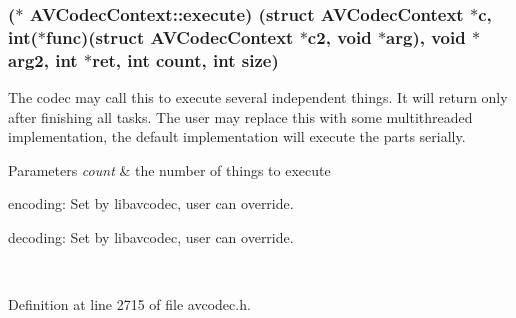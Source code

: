 \subsubsection[{\texorpdfstring{execute}{execute}}]{($\ast$ A\+V\+Codec\+Context\+::execute) (struct {\bf A\+V\+Codec\+Context} $\ast${\bf c}, {\bf int}($\ast$func)(struct {\bf A\+V\+Codec\+Context} $\ast${\bf c2}, {\bf void} $\ast$arg), {\bf void} $\ast$arg2, {\bf int} $\ast$ret, {\bf int} {\bf count}, {\bf int} {\bf size})}\hypertarget{struct_a_v_codec_context_a83b625bf9454b63ee8c04ac4f8ef648c}{}\label{struct_a_v_codec_context_a83b625bf9454b63ee8c04ac4f8ef648c}
The codec may call this to execute several independent things. It will return only after finishing all tasks. The user may replace this with some multithreaded implementation, the default implementation will execute the parts serially. 
\begin{DoxyParams}{Parameters}
{\em count} & the number of things to execute
\begin{DoxyItemize}
\item encoding\+: Set by libavcodec, user can override.
\item decoding\+: Set by libavcodec, user can override. 
\end{DoxyItemize}\\
\hline
\end{DoxyParams}


Definition at line 2715 of file avcodec.\+h.

